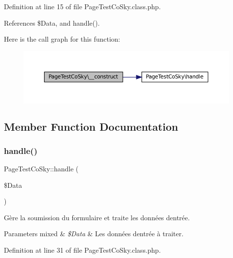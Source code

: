 Definition at line 15 of file Page\+Test\+Co\+Sky.\+class.\+php.



References \$\+Data, and handle().

Here is the call graph for this function\+:\nopagebreak
\begin{figure}[H]
\begin{center}
\leavevmode
\includegraphics[width=350pt]{class_page_test_co_sky_a2c879f6b4c2273cb0a6e8a37e804b882_cgraph}
\end{center}
\end{figure}


\subsection{Member Function Documentation}
\mbox{\label{class_page_test_co_sky_a5fc9b3bf4014917cca71917a46f82bfc}} 
\subsubsection{\texorpdfstring{handle()}{handle()}}
{\footnotesize\ttfamily Page\+Test\+Co\+Sky\+::handle (\begin{DoxyParamCaption}\item[{}]{\$\+Data }\end{DoxyParamCaption})\hspace{0.3cm}{\ttfamily [protected]}}

Gère la soumission du formulaire et traite les données d\textquotesingle{}entrée.


\begin{DoxyParams}[1]{Parameters}
mixed & {\em \$\+Data} & Les données d\textquotesingle{}entrée à traiter. \\
\hline
\end{DoxyParams}


Definition at line 31 of file Page\+Test\+Co\+Sky.\+class.\+php.



